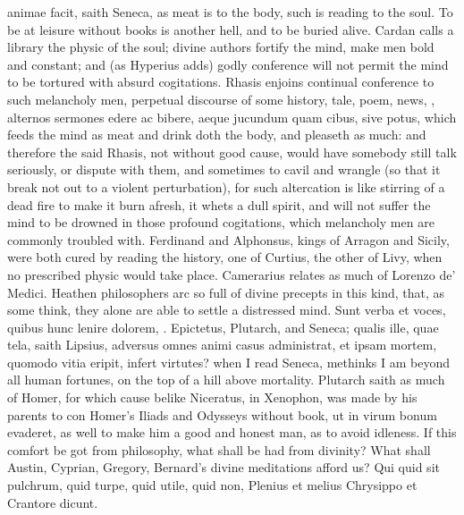 {animae facit, saith Seneca, as meat is to the body, such is reading to
the soul. To be at leisure without books is another hell, and to
be buried alive. Cardan calls a library the physic of the soul;
divine authors fortify the mind, make men bold and constant; and
(as Hyperius adds) godly conference will not permit the mind to be
tortured with absurd cogitations. Rhasis enjoins continual conference
to such melancholy men, perpetual discourse of some history, tale,
poem, news, \etc{}, alternos sermones edere ac bibere, aeque jucundum quam
cibus, sive potus, which feeds the mind as meat and drink doth the
body, and pleaseth as much: and therefore the said Rhasis, not without
good cause, would have somebody still talk seriously, or dispute with
them, and sometimes to cavil and wrangle (so that it break not
out to a violent perturbation), for such altercation is like stirring
of a dead fire to make it burn afresh, it whets a dull spirit, and will
not suffer the mind to be drowned in those profound cogitations, which
melancholy men are commonly troubled with. Ferdinand and
Alphonsus, kings of Arragon and Sicily, were both cured by reading the
history, one of Curtius, the other of Livy, when no prescribed physic
would take place. Camerarius relates as much of Lorenzo de'
Medici. Heathen philosophers arc so full of divine precepts in this
kind, that, as some think, they alone are able to settle a distressed
mind. Sunt verba et voces, quibus hunc lenire dolorem, \etc{}.
Epictetus, Plutarch, and Seneca; qualis ille, quae tela, saith Lipsius,
adversus omnes animi casus administrat, et ipsam mortem, quomodo vitia
eripit, infert virtutes? when I read Seneca, methinks I am beyond
all human fortunes, on the top of a hill above mortality. Plutarch
saith as much of Homer, for which cause belike Niceratus, in Xenophon,
was made by his parents to con Homer's Iliads and Odysseys without
book, ut in virum bonum evaderet, as well to make him a good and honest
man, as to avoid idleness. If this comfort be got from philosophy, what
shall be had from divinity? What shall Austin, Cyprian, Gregory,
Bernard's divine meditations afford us?
Qui quid sit pulchrum, quid turpe, quid utile, quid non,
Plenius et melius Chrysippo et Crantore dicunt.

}
